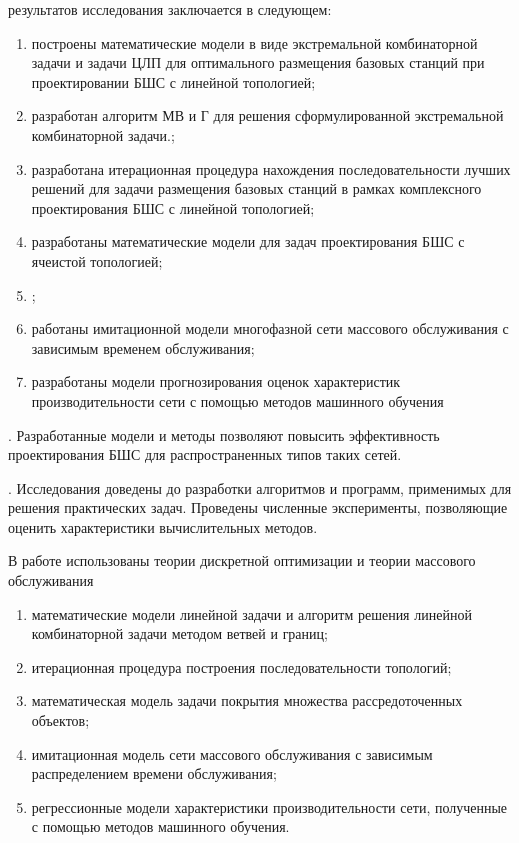 {\novelty} результатов исследования заключается в следующем:
\begin{enumerate}[beginpenalty=10000] %
  \item построены математические модели в виде экстремальной комбинаторной задачи и задачи ЦЛП для оптимального размещения базовых станций при проектировании БШС с линейной топологией;  
  \item разработан алгоритм МВ и Г для решения сформулированной экстремальной комбинаторной задачи.;
  \item разработана итерационная процедура нахождения последовательности лучших решений для задачи размещения базовых станций в рамках комплексного проектирования БШС с линейной топологией;
  \item разработаны математические модели для задач проектирования БШС с ячеистой топологией;
  \item  {};
  \item работаны имитационной модели многофазной сети массового обслуживания с зависимым временем обслуживания;
  \item разработаны модели прогнозирования оценок характеристик производительности сети с помощью методов машинного обучения 
\end{enumerate}

{\influence}. Разработанные модели и методы позволяют повысить эффективность проектирования БШС для распространенных типов таких сетей.

{\elaboration}. Исследования доведены до разработки алгоритмов и программ, применимых для решения практических задач. Проведены численные эксперименты, позволяющие оценить характеристики вычислительных методов.

{\methods} В работе использованы теории дискретной оптимизации и теории массового обслуживания

{}
\begin{enumerate}[beginpenalty=10000] %
  \item математические модели линейной задачи и алгоритм решения линейной комбинаторной задачи методом ветвей и границ;
  \item итерационная процедура построения последовательности топологий; 
  \item математическая модель задачи покрытия множества рассредоточенных объектов; 
  \item имитационная модель сети массового обслуживания с зависимым распределением времени обслуживания;
  \item регрессионные модели характеристики производительности сети, полученные с помощью методов машинного обучения.
\end{enumerate}

